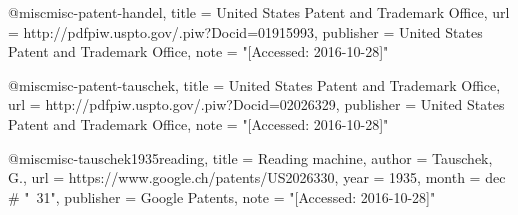 @misc{misc-patent-handel,
    title =         {United States Patent and Trademark Office},
    url =           {http://pdfpiw.uspto.gov/.piw?Docid=01915993},
    publisher =     {United States Patent and Trademark Office},
    note =          "[Accessed: 2016-10-28]"
}

@misc{misc-patent-tauschek,
    title =         {United States Patent and Trademark Office},
    url =           {http://pdfpiw.uspto.gov/.piw?Docid=02026329},
    publisher =     {United States Patent and Trademark Office},
    note =          "[Accessed: 2016-10-28]"
}

@misc{misc-tauschek1935reading,
    title =         {Reading machine},
    author =        {Tauschek, G.},
    url =           {https://www.google.ch/patents/US2026330},
    year =          {1935},
    month =         dec # "~31",
    publisher =     {Google Patents},
    note =          "[Accessed: 2016-10-28]"
}